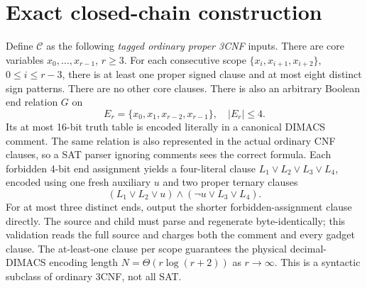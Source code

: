 \documentclass[11pt]{article}
\begin{document}
\section{Exact closed-chain construction}
Define $\mathcal C$ as the following \emph{tagged ordinary proper 3CNF} inputs. There are core variables $x_0,\ldots,x_{r-1}$, $r\ge3$. For each consecutive scope $\{x_i,x_{i+1},x_{i+2}\}$, $0\le i\le r-3$, there is at least one proper signed clause and at most eight distinct sign patterns. There are no other core clauses. There is also an arbitrary Boolean end relation $G$ on
\[
 E_r=\{x_0,x_1,x_{r-2},x_{r-1}\},\quad |E_r|\le4.
\]
Its at most 16-bit truth table is encoded literally in a canonical DIMACS comment. The same relation is also represented in the actual ordinary CNF clauses, so a SAT parser ignoring comments sees the correct formula. Each forbidden 4-bit end assignment yields a four-literal clause $L_1\vee L_2\vee L_3\vee L_4$, encoded using one fresh auxiliary $u$ and two proper ternary clauses
\[
 (L_1\vee L_2\vee u)\wedge(\neg u\vee L_3\vee L_4).
\]
For at most three distinct ends, output the shorter forbidden-assignment clause directly. The source and child must parse and regenerate byte-identically; this validation reads the full source and charges both the comment and every gadget clause. The at-least-one clause per scope guarantees the physical decimal-DIMACS encoding length $N=\Theta(r\log(r+2))$ as $r\to\infty$. This is a syntactic subclass of ordinary 3CNF, not all SAT.
\end{document}

